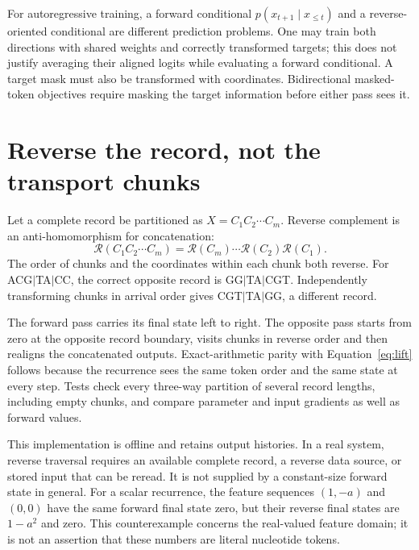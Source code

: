 For autoregressive training, a forward conditional
$p(x_{t+1}\mid x_{\leq t})$ and a reverse-oriented conditional are different
prediction problems. One may train both directions with shared weights and
correctly transformed targets; this does not justify averaging their aligned
logits while evaluating a forward conditional. A target mask must also be
transformed with coordinates. Bidirectional masked-token objectives require
masking the target information before either pass sees it.

\section{Reverse the record, not the transport chunks}

Let a complete record be partitioned as $X=C_1C_2\cdots C_m$.
Reverse complement is an anti-homomorphism for concatenation:
\begin{equation}
 \mathcal R(C_1C_2\cdots C_m)
 =\mathcal R(C_m)\cdots\mathcal R(C_2)\mathcal R(C_1).
 \label{eq:chunks}
\end{equation}
The order of chunks and the coordinates within each chunk both reverse.
For ACG$\mid$TA$\mid$CC, the correct opposite record is
GG$\mid$TA$\mid$CGT. Independently transforming chunks in arrival order gives
CGT$\mid$TA$\mid$GG, a different record.



The forward pass carries its final state left to right. The opposite pass
starts from zero at the opposite record boundary, visits chunks in reverse
order and then realigns the concatenated outputs. Exact-arithmetic parity with
Equation~\ref{eq:lift} follows because the recurrence sees the same token order
and the same state at every step. Tests check every three-way partition of
several record lengths, including empty chunks, and compare parameter and
input gradients as well as forward values.

This implementation is offline and retains output histories. In a real
system, reverse traversal requires an available complete record, a reverse
data source, or stored input that can be reread. It is not supplied by a
constant-size forward state in general. For a scalar recurrence,
the feature sequences $(1,-a)$ and $(0,0)$ have the same forward final state
zero, but their reverse final states are $1-a^2$ and zero. This counterexample
concerns the real-valued feature domain; it is not an assertion that these
numbers are literal nucleotide tokens.

